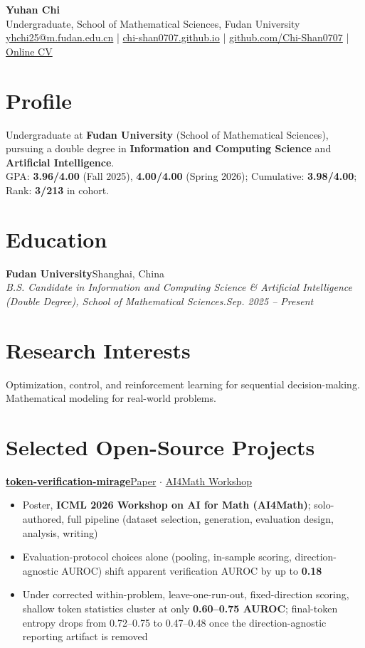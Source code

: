 \documentclass[10pt,letterpaper]{article}
\newcommand{\entry}[4]{%
  \textbf{#1}\hfill #2\\
  \textit{#3}\hfill \textit{#4}\vspace{1pt}
}
\newcommand{\project}[2]{\textbf{#1}\hfill #2}
\begin{document}
{\LARGE \textbf{Yuhan Chi}}\\[-1pt]
Undergraduate, School of Mathematical Sciences, Fudan University\\
\href{mailto:yhchi25@m.fudan.edu.cn}{yhchi25@m.fudan.edu.cn} \;|\;
\href{https://chi-shan0707.github.io}{chi-shan0707.github.io} \;|\;
\href{https://github.com/Chi-Shan0707}{github.com/Chi-Shan0707} \;|\;
\href{https://chi-shan0707.github.io/cv}{Online CV}

\small

\section*{Profile}
Undergraduate at \textbf{Fudan University} (School of Mathematical Sciences), pursuing a double degree in \textbf{Information and Computing Science} and \textbf{Artificial Intelligence}.\\[3pt]
GPA: \textbf{3.96/4.00} (Fall 2025), \textbf{4.00/4.00} (Spring 2026); Cumulative: \textbf{3.98/4.00}; Rank: \textbf{3/213} in cohort.

\section*{Education}
\entry{Fudan University}{Shanghai, China}{B.S. Candidate in Information and Computing Science \& Artificial Intelligence (Double Degree), School of Mathematical Sciences.}{Sep. 2025 -- Present}

\section*{Research Interests}
\normalsize
Optimization, control, and reinforcement learning for sequential decision-making.\\[3pt]
Mathematical modeling for real-world problems.
\small

\section*{Selected Open-Source Projects}

\project{\href{https://github.com/Chi-Shan0707/token-verification-mirage}{token-verification-mirage}}{\href{https://openreview.net/pdf?id=wRImV3kfR1}{Paper} $\cdot$ \href{https://ai4math2026.github.io/}{AI4Math Workshop}}
\begin{itemize}
  \item Poster, \textbf{ICML 2026 Workshop on AI for Math (AI4Math)}; solo-authored, full pipeline (dataset selection, generation, evaluation design, analysis, writing)
  \item Evaluation-protocol choices alone (pooling, in-sample scoring, direction-agnostic AUROC) shift apparent verification AUROC by up to \textbf{0.18}
  \item Under corrected within-problem, leave-one-run-out, fixed-direction scoring, shallow token statistics cluster at only \textbf{0.60--0.75 AUROC}; final-token entropy drops from 0.72--0.75 to 0.47--0.48 once the direction-agnostic reporting artifact is removed
\end{itemize}
\end{document}
